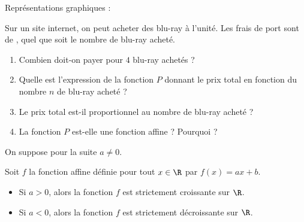 \documentclass[10pt,openright,twoside,french]{book}
\begin{document}
\begin{center}
Représentations graphiques :

    \hfill
    \hfill
\end{center}

\begin{Exemple}
    Sur un site internet, on peut acheter des blu-ray à  l'unité. Les frais de port sont de , quel que soit le nombre de blu-ray acheté.
    \begin{enumerate}
        \item Combien doit-on payer pour $4$ blu-ray achetés ?
        \item Quelle est l'expression de la fonction $P$ donnant le prix total en fonction du nombre $n$ de blu-ray acheté ?
        \item Le prix total est-il proportionnel au nombre de blu-ray acheté ?
        \item La fonction $P$ est-elle une fonction affine ? Pourquoi ?
    \end{enumerate}
\end{Exemple}

On suppose pour la suite $a \neq 0$.

\begin{Thm}
    Soit $f$ la fonction affine définie pour tout $x \in \R$ par $f(x) = ax + b$.
    \begin{itemize}
        \item Si $a > 0$, alors la fonction $f$ est strictement croissante sur $\R$.
        \item Si $a < 0$, alors la fonction $f$ est strictement décroissante sur $\R$.
    \end{itemize}
\end{Thm}\clearpage
\end{document}
